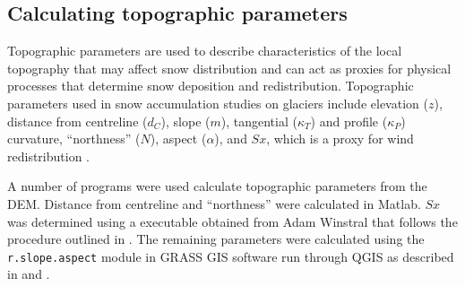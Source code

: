 \documentclass[12pt]{article}
\begin{document}
\subsection{Calculating topographic parameters}
\label{sec:topoCalc}

Topographic parameters are used to describe characteristics of the local topography that may affect snow distribution and can act as proxies for physical processes that determine snow deposition and redistribution. Topographic parameters used in snow accumulation studies on glaciers include elevation ($z$), distance from centreline ($d_C$), slope ($m$), tangential ($\kappa_T$) and profile ($\kappa_P$) curvature, ``northness'' ($N$), aspect ($\alpha$), and $Sx$, which is a proxy for wind redistribution \citep{Basist1994, Revuelto2014, McGrath2015}.	
 
A number of programs were used calculate topographic parameters from the DEM. Distance from centreline and ``northness'' were calculated in Matlab. $Sx$ was determined using a executable obtained from Adam Winstral that follows the procedure outlined in \cite{Winstral2002}. The remaining parameters were calculated using the \texttt{r.slope.aspect} module in GRASS GIS software run through QGIS as described in \cite{Mitavsova1993} and \cite{Hofierka2009}. 
\end{document}
